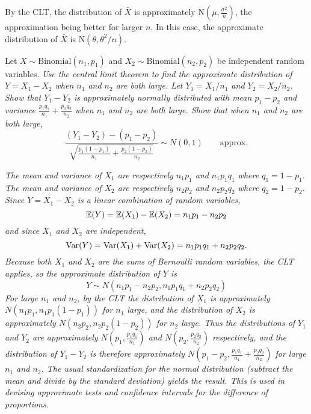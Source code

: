 \begin{exercise}
\begin{questions}
\begin{answer}
By the CLT, the distribution of $\bar{X}$ is approximately $\text{N}(\mu,\frac{\sigma^{2}}{n})$, the approximation being better for larger $n$. In this case, the approximate distribution of $\bar{X}$ is $\text{N}\left(\theta,\theta^2/n\right)$. 
\end{answer}


\question
Let $X\sim\text{Binomial}(n_1,p_1)$ and $X_2\sim\text{Binomial}(n_2,p_2)$ be independent random variables.
\ben
\it
Use the central limit theorem to find the approximate distribution of $Y = X_1 - X_2$ when $n_1$ and $n_2$ are both large.
\it
Let $Y_1 = X_1/n_1$ and $Y_2 = X_2/n_2$. Show that $Y_1 - Y_2$ is approximately normally distributed with mean $p_1 - p_2$ and variance $\frac{p_1q_1}{n_1} +\frac{p_2q_2}{n_2}$ when $n_1$ and $n_2$ are both large.
\it
Show that when $n_1$ and $n_2$ are both large,
\[
\frac{(Y_1 -Y_2 )-(p_1 -p_2 )}{\sqrt{\frac{p_1 (1-p_1 )}{n_1 } +\frac{p_2 (1-p_2 )}{n_2 } } } 
	 \sim N(0,1) \qquad\text{approx.}
\]
\een

\begin{answer}
\ben
\it
The mean and variance of $X_1$ are respectively $n_1p_1$ and $n_1p_1q_1$ where $q_1=1-p_1$. The mean and variance of $X_2$ are respectively $n_2p_2$ and $n_2p_2q_2$ where $q_2=1-p_2$. Since $Y = X_1 - X_2$ is a linear combination of random variables,
\[
\mathbb{E}(Y) = \mathbb{E}(X_1)-\mathbb{E}(X_2) = n_1p_1- n_2p_2
\]
and since $X_1$ and $X_2$ are independent,
\[
\text{Var}(Y) = \text{Var}(X_1) + \text{Var}(X_2) = n_1p_1q_1 + n_2p_2q_2.
\]
Because both $X_1$ and $X_2$ are the sums of Bernoulli random variables, the CLT applies, so the approximate distribution of $Y$ is
\[ 
Y\sim N(n_1p_1- n_2p_2, n_1p_1q_1 + n_2p_2q_2)
\]
\it
For large $n_1$ and $n_2$, by the CLT the distribution of $X_1$ is approximately $N(n_1p_1,n_1p_1(1 - p_1))$ for $n_1$ large, and the distribution of $X_2$ is approximately $N(n_2p_2,n_2p_2(1 - p_2))$ for $n_2$ large. Thus the distributions of $Y_1$ and $Y_2$ are approximately $N\left(p_1,\frac{p_1q_1}{n_1}\right)$ and $N\left(p_2,\frac{p_2q_2}{n_2}\right)$ respectively, and the distribution of $Y_1 - Y_2$ is therefore approximately $N\left(p_1-p_2, \frac{p_1q_1}{n_1}+\frac{p_2q_2}{n_2}\right)$ for large $n_1$ and $n_2$.
\it
The usual standardization for the normal distribution (subtract the mean and divide by the standard deviation) yields the result. This is used in devising approximate tests and confidence intervals for the difference of proportions.
\een
\end{answer}



\end{questions}
\end{exercise}
